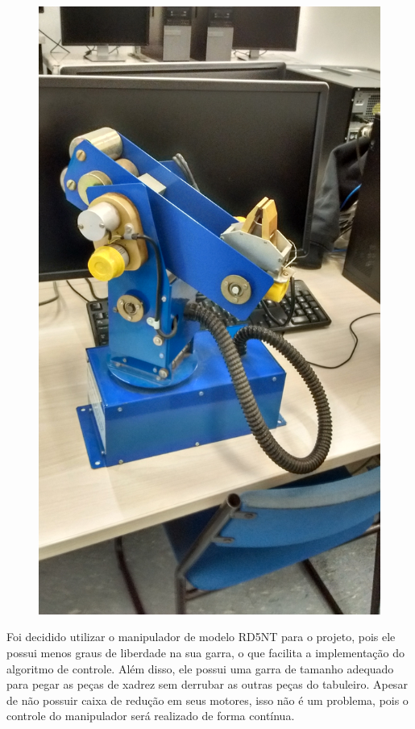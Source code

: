 \begin{figure}[H]
\begin{minipage}{.5\textwidth}
        \includegraphics[keepaspectratio=true, width=0.9\linewidth]
            {img/foto-manipulador-RD5NT.jpg}
        \label{fig:fotoManipuladorRD5NT}
    \end{minipage}%
\end{figure}

Foi decidido utilizar o manipulador de modelo RD5NT para o projeto, pois ele possui menos graus de liberdade na sua garra, o que facilita a implementação do algoritmo de controle.
Além disso, ele possui uma garra de tamanho adequado para pegar as peças de xadrez sem derrubar as outras peças do tabuleiro.
Apesar de não possuir caixa de redução em seus motores, isso não é um problema, pois o controle do manipulador será realizado de forma contínua.


